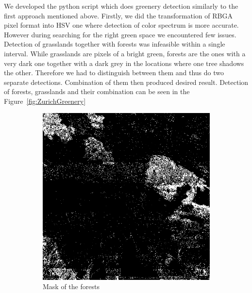 \documentclass[letterpaper]{article}
\begin{document}
\indent We developed the python script which does greenery detection similarly to the first approach mentioned above. 
Firstly, we did the transformation of RBGA pixel format into HSV one where detection of color spectrum is more accurate.
However during searching for the right green space we encountered few issues. Detection of grasslands together 
with forests was infeasible within a single interval. While grasslands are pixels of a bright green, forests are 
the ones with a very dark one together with a dark grey in the locations where one tree shadows the other. 
Therefore we had to distinguish between them and thus do two separate detections. Combination of them then 
produced desired result. Detection of forests, grasslands and their combination can be seen in the Figure~\ref{fig:ZurichGreenery}

\begin{figure}
    \centering
    \begin{subfigure}{.22\textwidth}
        \centering
        \includegraphics[width=.95\linewidth]{../images/greenery/forests.png}
        \caption[width=.2\textwidth]{Mask of the forests}
    \end{subfigure}%
    \begin{subfigure}{.22\textwidth}
        \centering

\end{subfigure}
\end{figure}
\end{document}
